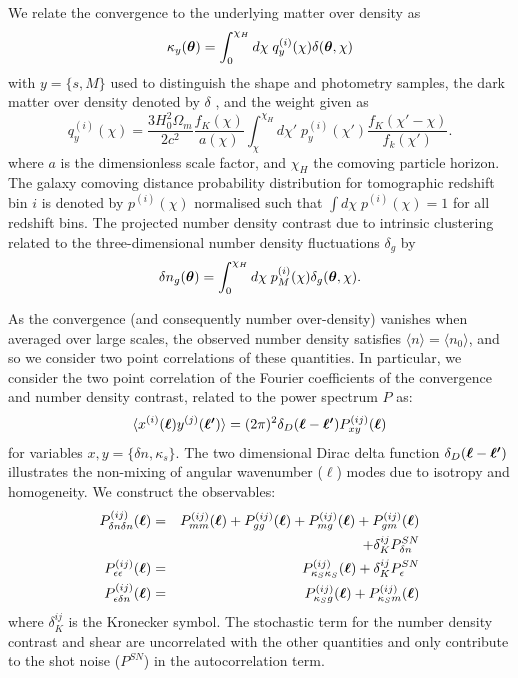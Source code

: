 \documentclass[useAMS,usenatbib,times,letter,amssymb]{mn2e}
\def\be{\begin{equation}}
\def\ee{\end{equation}}
\def\bea{\begin{eqnarray}}
\def\eea{\end{eqnarray}}
\newcommand{\bm}[1]{\mbox{\boldmath{$#1$}}}   %
\begin{document}
We relate the convergence to the underlying matter over density as 
\be\label{eqn:ProjectedConvergence}
\kappa_{y}(\bm{\theta}) = \int_0^{\chi_H} d\chi\; q_{y}^{(i)}(\chi) \delta(\bm{\theta},\chi) 
\ee
with $y = \{s,M \}$ used to distinguish the shape and photometry samples,  the dark matter over density denoted by $\delta$ , and the weight given as \citep{Bartelmann:2001p431}
\be\label{eqn:ConvergenceWeight}
q_{y}^{(i)}(\chi) = \frac{3H_0^2\Omega_m}{2c^2}\frac{f_K(\chi)}{a(\chi)}\int^{\chi_H}_\chi d\chi'\; p_{y}^{(i)}(\chi')\frac{f_K(\chi'-\chi)}{f_k(\chi')}.
\ee
where $a$ is the dimensionless scale factor, and $\chi_{H}$ the comoving particle horizon. The galaxy comoving distance probability distribution for tomographic redshift bin $i$ is denoted by $p^{(i)}(\chi)$ normalised such that $\int d\chi \;p^{(i)}(\chi)  = 1$ for all redshift bins. 
The projected number density contrast due to intrinsic clustering related to the three-dimensional number density fluctuations $\delta_g$ by
\be\label{eqn:Projected_NumberDensity}
\delta n_g(\bm{\theta}) = \int_0^{\chi_H} d\chi\; p_{M}^{(i)}(\chi) \delta_g(\bm{\theta},\chi).
\ee


As the convergence (and consequently number over-density) vanishes when averaged over large scales, the observed number density satisfies $\langle n\rangle = \langle n_0 \rangle$, and so we consider two point correlations of these quantities. In particular, we consider the two point correlation of the Fourier coefficients of the convergence and number density contrast, related to the power spectrum $P$ as:
\be\label{eqn:PSDef}
\langle x^{(i)}(\bm{\ell})y^{(j)}(\bm{\ell'})\rangle = (2\pi)^2\delta_D(\bm{\ell}-\bm{\ell'})P^{(ij)}_{xy}(\bm{\ell})
\ee
for variables $x,y = \{\delta n, \kappa_s\}$. The two dimensional Dirac delta function $\delta_D(\bm{\ell}-\bm{\ell'})$ illustrates the non-mixing of angular wavenumber ($\ell$) modes due to isotropy and homogeneity.  We construct the observables:
\bea\label{eqn:NumberDensityContrastPS}
P^{(ij)}_{\delta n\delta n}(\bm{\ell}) &=& P^{(ij)}_{mm}(\bm{\ell}) +P^{(ij)}_{gg}(\bm{\ell}) + P^{(ij)}_{mg}(\bm{\ell}) + P^{(ij)}_{gm}(\bm{\ell})   \nonumber\\
 & & + \delta_K^{ij}P^{SN}_{\delta n} \\
P^{(ij)}_{\epsilon\epsilon}(\bm{\ell})  &=& P^{(ij)}_{\kappa_S\kappa_S}(\bm{\ell}) + \delta_K^{ij}P^{SN}_{\epsilon} \\
P^{(ij)}_{\epsilon\delta n}(\bm{\ell}) &=& P^{(ij)}_{\kappa_S g}(\bm{\ell}) + P^{(ij)}_{\kappa_S m}(\bm{\ell})\label{eqn:NumberDensityContrastPS-GGLensing}
\eea
where $\delta_K^{ij}$ is the Kronecker symbol. The stochastic term for the number density contrast and shear are uncorrelated with the other quantities and only contribute to the shot noise ($P^{SN}$) in the autocorrelation term.
\end{document}
